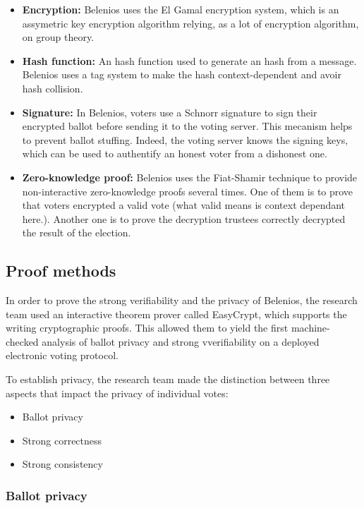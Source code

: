 \documentclass[12pt, a4paper]{report}
\begin{document}
\begin{itemize}
\item \textbf{Encryption:} Belenios uses the El Gamal encryption system, which is an assymetric key encryption algorithm relying, as a lot of encryption algorithm, on group theory.

\item \textbf{Hash function:} An hash function used to generate an hash from a message. Belenios uses a tag system to make the hash context-dependent and avoir hash collision.

\item \textbf{Signature:} In Belenios, voters use a Schnorr signature to sign their encrypted ballot before sending it to the voting server. This mecanism helps to prevent ballot stuffing. Indeed, the voting server knows the signing keys, which can be used to authentify an honest voter from a dishonest one.

\item \textbf{Zero-knowledge proof:} Belenios uses the Fiat-Shamir technique to provide non-interactive zero-knowledge proofs several times. One of them is to prove that voters encrypted a valid vote (what valid  means is context dependant here.). Another one is to prove the decryption trustees correctly decrypted the result of the election. 
\end{itemize}

\subsection{Proof methods}

In order to prove the strong verifiability and the privacy of Belenios, the research team used an interactive theorem prover called EasyCrypt, which supports the writing cryptographic proofs.
This allowed them to yield the first machine-checked analysis of ballot privacy and strong vverifiability on a deployed electronic voting protocol.

To establish privacy, the research team made the distinction between three aspects that impact the privacy of individual votes:

\begin{itemize}
\item Ballot privacy
\item Strong correctness
\item Strong consistency
\end{itemize}

\subsubsection{Ballot privacy}
\end{document}
